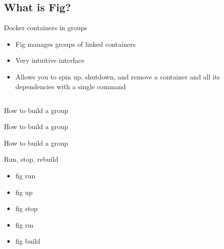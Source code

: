 \documentclass{beamer}
\begin{document}
    \subsection{What is Fig?}
    \begin{frame}{Docker containers in groups}
        \begin{itemize}
            \item Fig manages groups of linked containers
            \item Very intuitive interface
            \item Allows you to spin up, shutdown, and remove a container and all its dependencies with a single command
        \end{itemize}
    \end{frame}
    \subsection{}
    \begin{frame}{How to build a group}
        \lstFigYmlNginx
    \end{frame}
    \begin{frame}{How to build a group}
        \lstFigYmlPhpFpm
    \end{frame}
    \begin{frame}{How to build a group}
        \lstFigYmlMysql
    \end{frame}
    \begin{frame}{Run, stop, rebuild}
        \begin{itemize}
            \item fig run
            \item fig up
            \item fig stop
            \item fig rm
            \item fig build
        \end{itemize}
    \end{frame}
\end{document}
